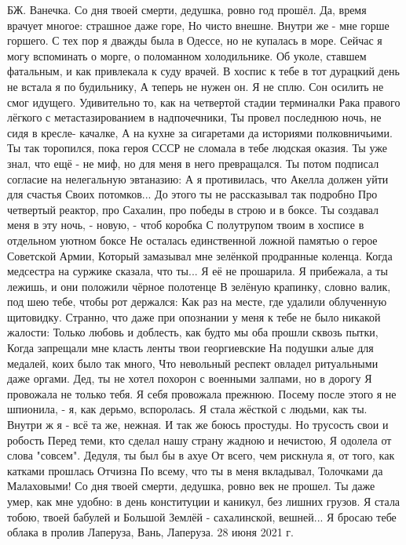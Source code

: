 БЖ. Ванечка.
Со дня твоей смерти, дедушка, ровно год прошёл.
Да, время врачует многое: страшное даже горе,
Но чисто внешне. Внутри же - мне горше горшего.
С тех пор я дважды была в Одессе, но не купалась в море.
Сейчас я могу вспоминать о морге, о поломанном холодильнике.
Об уколе, ставшем фатальным, и как привлекала к суду врачей.
В хоспис к тебе в тот дурацкий день не встала я по будильнику,
А теперь не нужен он. Я не сплю. Сон осилить не смог идущего.
Удивительно то, как на четвертой стадии терминалки
Рака правого лёгкого с метастазированием в надпочечники,
Ты провел последнюю ночь, не сидя в кресле- качалке,
А на кухне за сигаретами да историями полковничьими.
Ты так торопился, пока героя СССР не сломала в тебе людская оказия.
Ты уже знал, что ещё - не миф, но для меня в него превращался.
Ты потом подписал согласие на нелегальную эвтаназию:
А я противилась, что Акелла должен уйти для счастья
Своих потомков... До этого ты не рассказывал так подробно
Про четвертый реактор, про Сахалин, про победы в строю и в боксе.
Ты создавал меня в эту ночь, - новую, - чтоб коробка
С полутрупом твоим в хосписе в отдельном уютном боксе
Не осталась единственной ложной памятью о герое Советской Армии,
Который замазывал мне зелёнкой продранные коленца.
Когда медсестра на суржике сказала, что ты... 
Я её не прошарила.
Я прибежала, а ты лежишь, и они положили чёрное полотенце
В зелёную крапинку, словно валик, под шею тебе, чтобы рот держался:
Как раз на месте, где удалили облученную щитовидку.
Странно, что даже при опознании у меня к тебе не было никакой жалости:
Только любовь и доблесть, как будто мы оба прошли сквозь пытки,
Когда запрещали мне класть ленты твои георгиевские
На подушки алые для медалей, коих было так много,
Что невольный респект овладел ритуальными даже оргами.
Дед, ты не хотел похорон с военными залпами, но в дорогу
Я провожала не только тебя. Я себя провожала прежнюю.
Посему после этого я не шпионила, - я, как дерьмо, вспоролась.
Я стала жёсткой с людьми, как ты. Внутри ж я - всё та же, нежная.
И так же боюсь простуды. Но трусость свои и робость
Перед теми, кто сделал нашу страну жадною и нечистою,
Я одолела от слова "совсем". Дедуля, ты был бы в ахуе
От всего, чем рискнула я, от того, как катками прошлась Отчизна
По всему, что ты в меня вкладывал, Толочками да Малаховыми!
Со дня твоей смерти, дедушка, ровно век не прошел.
Ты даже умер, как мне удобно: в день конституции и каникул, без лишних грузов.
Я стала тобою, твоей бабулей и Большой Землёй - сахалинской, вешней...
Я бросаю тебе облака в пролив Лаперуза, 
Вань, Лаперуза.
28 июня 2021 г.


